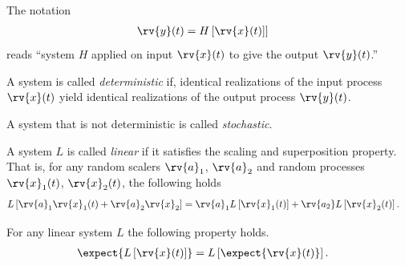 \begin{remarkBox}
    The notation 
    \begin{align}
        \rv{y}(t) &= H\left[ \rv{x}(t) \right]]
    \end{align}
    reads ``system $H$ applied on input $\rv{x}(t)$ to give the output $\rv{y}(t)$.''
\end{remarkBox}
\begin{definitionBox}
    A system is called \emph{deterministic} if, identical realizations of the input process $\rv{x}(t)$ yield identical realizations of the output process $\rv{y}(t)$.
\end{definitionBox}

\begin{definitionBox}
    A system that is not deterministic is called \emph{stochastic}.
\end{definitionBox}

\begin{definitionBox}
    A system $L$ is called \emph{linear} if it satisfies the scaling and superposition property. That is, for any random scalers $\rv{a}_{1}$, $\rv{a}_{2}$ and random processes $\rv{x}_{1}(t)$, $\rv{x}_{2}(t)$, the following holds
    \begin{align}
        L\left[ \rv{a}_{1}\rv{x}_{1}(t) + \rv{a}_{2}\rv{x}_{2} \right]
        &= 
        \rv{a}_{1}L\left[ \rv{x}_{1}(t) \right] + \rv{a_{2}}L\left[ \rv{x}_{2}(t) \right].
    \end{align}
\end{definitionBox}

\begin{theoremBox}
     For any linear system $L$ the following property holds.
     \begin{align}
         \expect{L\left[ \rv{x}(t) \right]} &= L\left[ \expect{ \rv{x}(t)} \right].
     \end{align}
\end{theoremBox}

